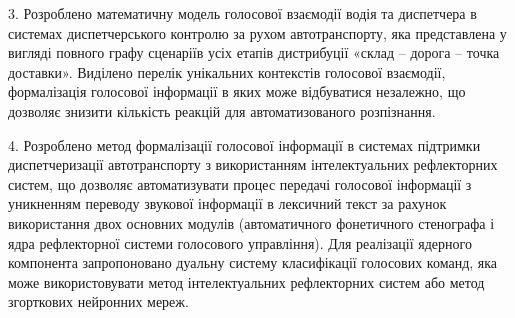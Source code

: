 3. Розроблено математичну модель голосової взаємодії водія та диспетчера в системах диспетчерського контролю за рухом автотранспорту, яка представлена у вигляді повного графу сценаріїв усіх етапів дистрибуції «склад – дорога – точка доставки». Виділено перелік унікальних контекстів голосової взаємодії, формалізація голосової інформації в яких може відбуватися незалежно, що дозволяє знизити кількість реакцій для автоматизованого розпізнання.


4. Розроблено метод формалізації голосової інформації в системах підтримки диспетчеризації автотранспорту з використанням інтелектуальних рефлекторних систем, що дозволяє автоматизувати процес передачі голосової інформації з уникненням переводу звукової інформації в лексичний текст за рахунок використання двох основних модулів (автоматичного фонетичного стенографа і ядра рефлекторної системи голосового управління). Для реалізації ядерного компонента запропоновано дуальну систему класифікації голосових команд, яка може використовувати метод інтелектуальних рефлекторних систем або метод згорткових нейронних мереж.


